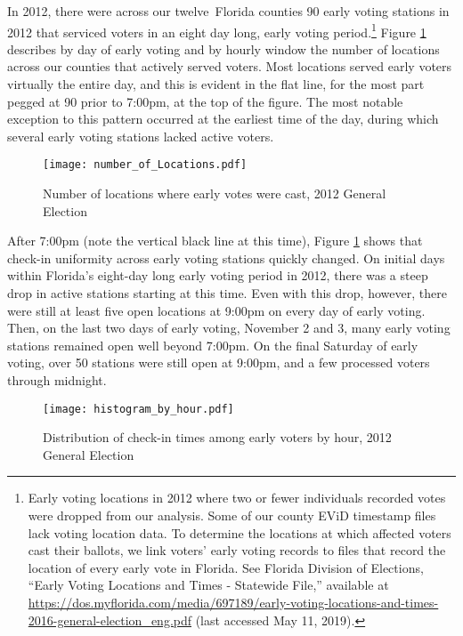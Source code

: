 \documentclass[12pt,titlepage]{article}
\newcommand{\numcounties}{twelve}
\begin{document}
In 2012, there were across our \numcounties\ Florida counties 90 early
voting stations in 2012 that serviced voters in an eight day long,
early voting period.\footnote{Early voting locations in 2012 where two
  or fewer individuals recorded votes were dropped from our analysis.
  Some of our county EViD timestamp files lack voting location data.
  To determine the locations at which affected voters cast their
  ballots, we link voters' early voting records to files that record
  the location of every early vote in Florida. See Florida Division of
  Elections, ``Early Voting Locations and Times - Statewide File,''
  available at
  \url{https://dos.myflorida.com/media/697189/early-voting-locations-and-times-2016-general-election_eng.pdf}
  (last accessed May 11, 2019).}  Figure \ref{fig:nrlocs2012}
describes by day of early voting and by hourly window the number of
locations across our counties that actively served voters. Most
locations served early voters virtually the entire day, and this is
evident in the flat line, for the most part pegged at 90
prior to 7:00pm, at the top of the figure.  The most notable exception
to this pattern occurred at the earliest time of the day, during which
several early voting stations lacked active voters.


\begin{figure}[!ht]
  \caption{Number of locations where early votes were cast, 2012 General Election}
  \label{fig:nrlocs2012}
  \centering
    \centering\texttt{[image: number\_of\_Locations.pdf]}
\end{figure}

After 7:00pm (note the vertical black line at this time), Figure
\ref{fig:nrlocs2012} shows that check-in uniformity across early
voting stations quickly changed.  On initial days within Florida's
eight-day long early voting period in 2012, there was a steep drop in
active stations starting at this time.  Even with this drop, however,
there were still at least five open locations at 9:00pm on every day
of early voting.  Then, on the last two days of early voting, November
2 and 3, many early voting stations remained open well beyond 7:00pm.
On the final Saturday of early voting, over 50 stations were still
open at 9:00pm, and a few processed voters through midnight.

\begin{figure}[!ht]
\caption{Distribution of check-in times among early voters by hour, 2012 General Election}
  \label{fig:hist2012}
  \centering
    \centering\texttt{[image: histogram\_by\_hour.pdf]}
\end{figure}
\end{document}
